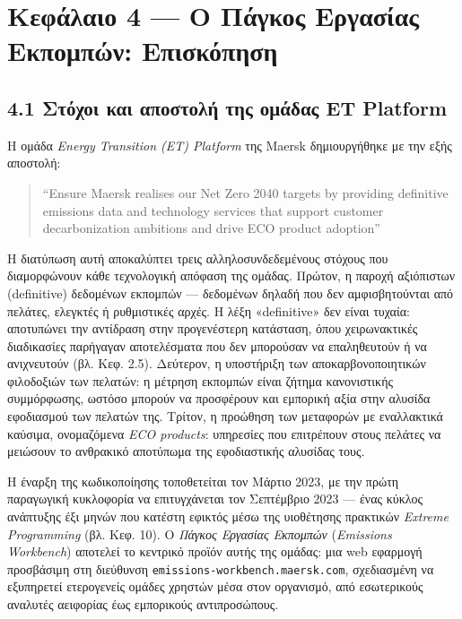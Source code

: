 \pagebreak

\chapter{Κεφάλαιο 4 --- Ο Πάγκος Εργασίας Εκπομπών:
Επισκόπηση}\label{ux3baux3b5ux3c6ux3acux3bbux3b1ux3b9ux3bf-4-ux3bf-ux3c0ux3acux3b3ux3baux3bfux3c2-ux3b5ux3c1ux3b3ux3b1ux3c3ux3afux3b1ux3c2-ux3b5ux3baux3c0ux3bfux3bcux3c0ux3ceux3bd-ux3b5ux3c0ux3b9ux3c3ux3baux3ccux3c0ux3b7ux3c3ux3b7}

\section{4.1 Στόχοι και αποστολή της ομάδας ET
Platform}\label{ux3c3ux3c4ux3ccux3c7ux3bfux3b9-ux3baux3b1ux3b9-ux3b1ux3c0ux3bfux3c3ux3c4ux3bfux3bbux3ae-ux3c4ux3b7ux3c2-ux3bfux3bcux3acux3b4ux3b1ux3c2-et-platform}

Η ομάδα \emph{Energy Transition (ET) Platform} της Maersk δημιουργήθηκε
με την εξής αποστολή:

\begin{quote}
``Ensure Maersk realises our Net Zero 2040 targets by providing
definitive emissions data and technology services that support customer
decarbonization ambitions and drive ECO product adoption''
\end{quote}

Η διατύπωση αυτή αποκαλύπτει τρεις αλληλοσυνδεδεμένους στόχους που
διαμορφώνουν κάθε τεχνολογική απόφαση της ομάδας. Πρώτον, η παροχή
αξιόπιστων (definitive) δεδομένων εκπομπών --- δεδομένων δηλαδή που δεν
αμφισβητούνται από πελάτες, ελεγκτές ή ρυθμιστικές αρχές. Η λέξη
«definitive» δεν είναι τυχαία: αποτυπώνει την αντίδραση στην
προγενέστερη κατάσταση, όπου χειρωνακτικές διαδικασίες παρήγαγαν
αποτελέσματα που δεν μπορούσαν να επαληθευτούν ή να ανιχνευτούν (βλ.
Κεφ. 2.5). Δεύτερον, η υποστήριξη των αποκαρβονοποιητικών φιλοδοξιών των
πελατών: η μέτρηση εκπομπών είναι ζήτημα κανονιστικής συμμόρφωσης,
ωστόσο μπορούν να προσφέρουν και εμπορική αξία στην αλυσίδα εφοδιασμού
των πελατών της. Τρίτον, η προώθηση των μεταφορών με εναλλακτικά
καύσιμα, ονομαζόμενα \emph{ECO products}: υπηρεσίες που επιτρέπουν στους
πελάτες να μειώσουν το ανθρακικό αποτύπωμα της εφοδιαστικής αλυσίδας
τους.

Η έναρξη της κωδικοποίησης τοποθετείται τον Μάρτιο 2023, με την πρώτη
παραγωγική κυκλοφορία να επιτυγχάνεται τον Σεπτέμβριο 2023 --- ένας
κύκλος ανάπτυξης έξι μηνών που κατέστη εφικτός μέσω της υιοθέτησης
πρακτικών \emph{Extreme Programming} (βλ. Κεφ. 10). Ο \emph{Πάγκος
Εργασίας Εκπομπών} (\emph{Emissions Workbench}) αποτελεί το κεντρικό
προϊόν αυτής της ομάδας: μια web εφαρμογή προσβάσιμη στη διεύθυνση
\texttt{emissions-workbench.maersk.com}, σχεδιασμένη να εξυπηρετεί
ετερογενείς ομάδες χρηστών μέσα στον οργανισμό, από εσωτερικούς αναλυτές
αειφορίας έως εμπορικούς αντιπροσώπους.

